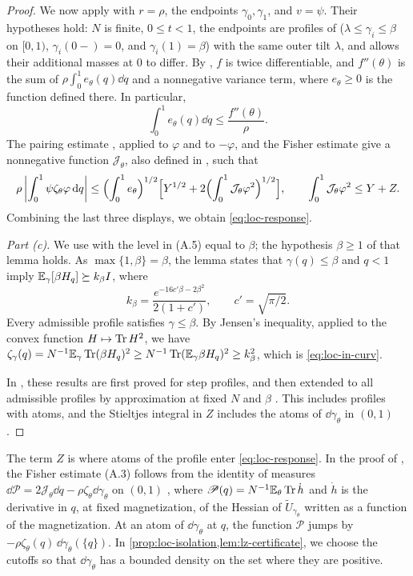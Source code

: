 \begin{proof}
We now apply \cite[Proposition~A.1 and Lemma~A.2]{AL} with $r=\rho$, the
endpoints $\gamma_0,\gamma_1$, and $v=\psi$. Their hypotheses hold: $N$ is
finite, $0\le t<1$, the endpoints are profiles of \cite[Appendix~A]{AL}
($\lambda\le\gamma_i\le\beta$ on $[0,1)$, $\gamma_i(0-)=0$, and
$\gamma_i(1)=\beta$) with the same outer tilt $\lambda$, and
\cite[Proposition~A.1]{AL} allows their additional masses at $0$ to differ.
By \cite[Proposition~A.1, (A.1)]{AL}, $f$ is twice differentiable, and
$f''(\theta)$ is the sum of $\rho\int_0^1e_\theta(q)\dd q$ and a nonnegative
variance term, where $e_\theta\ge0$ is the function defined there. In
particular,
\[
 \int_0^1e_\theta(q)\dd q\le\frac{f''(\theta)}\rho .
\]
The pairing estimate \cite[(A.2)]{AL}, applied to $\varphi$ and to $-\varphi$,
and the Fisher estimate \cite[(A.3)]{AL} give a nonnegative function
$\mathcal J_\theta$, also defined in \cite[Proposition~A.1]{AL}, such that
\[
 \rho\left|\int_0^1\psi\zeta_\theta\varphi\,\mathrm d q\right|
 \le\Bigl(\int_0^1e_\theta\Bigr)^{1/2}
 \Bigl[Y^{1/2}+2\Bigl(\int_0^1\mathcal J_\theta\varphi^2\Bigr)^{1/2}\Bigr],
 \qquad
 \int_0^1\mathcal J_\theta\varphi^2\le Y+Z .
\]
Combining the last three displays, we obtain \eqref{eq:loc-response}.

\emph{Part (c).} We use \cite[Lemma~A.3, (A.5)]{AL} with the level in
(A.5) equal to $\beta$; the hypothesis $\beta\ge1$ of that lemma holds. As
$\max\{1,\beta\}=\beta$, the lemma states that $\gamma(q)\le\beta$ and $q<1$ imply
$\mathbb E_\gamma[\beta H_q]\succeq k_\beta I$, where
\[
 k_\beta=\frac{e^{-16c'\beta-2\beta^2}}{2(1+c')},\qquad c'=\sqrt{\pi/2} .
\]
Every admissible profile satisfies $\gamma\le\beta$. By Jensen's inequality,
applied to the convex function $H\mapsto\operatorname{Tr} H^2$, we have
$\zeta_\gamma(q)=N^{-1}\mathbb E_\gamma\operatorname{Tr}(\beta H_q)^2\ge
N^{-1}\operatorname{Tr}(\mathbb E_\gamma\beta H_q)^2\ge k_\beta^2$, which is
\eqref{eq:loc-in-curv}.

In \cite{AL}, these results are first proved for step profiles, and then
extended to all admissible profiles by approximation at fixed $N$ and $\beta$
\cite[Section~7.4 and Appendix~A.3]{AL}. This includes profiles with atoms,
and the Stieltjes integral in $Z$ includes the atoms of $\dd\gamma_\theta$ in
$(0,1)$.
\end{proof}

\begin{remark}\label{rem:loc-stieltjes}
The term $Z$ is where atoms of the profile enter \eqref{eq:loc-response}. In
the proof of \cite[Lemma~A.2]{AL}, the Fisher estimate (A.3) follows from the
identity of measures $\dd\mathscr P=2\mathcal J_\theta\dd q
-\rho\zeta_\theta\dd\gamma_\theta$ on $(0,1)$ \cite[(A.19)]{AL}, where
$\mathscr P(q)=N^{-1}\mathbb E_\theta\operatorname{Tr}\dot h$ and $\dot h$ is the derivative in
$q$, at fixed magnetization, of the Hessian of $\widetilde U_{\gamma_\theta}$ written as
a function of the magnetization. At an atom of $\dd\gamma_\theta$ at $q$, the
function $\mathscr P$ jumps by $-\rho\zeta_\theta(q)\,\dd\gamma_\theta(\{q\})$.
In \cref{prop:loc-isolation,lem:lz-certificate}, we choose the cutoffs so that
$\dd\gamma_\theta$ has a bounded density on the set where they are positive.
\end{remark}

